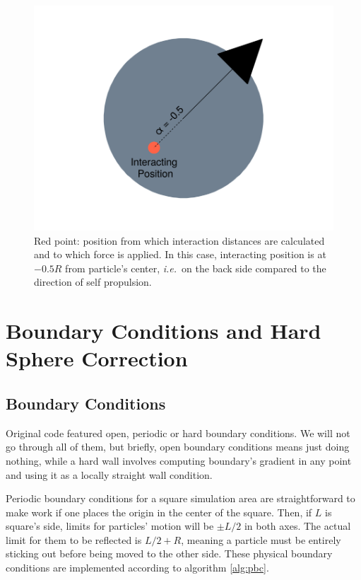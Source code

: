 \documentclass[../../master_thesis_np.tex]{subfiles}
\begin{document}
	\begin{figure}[htp]
		\centering
		\includegraphics[width=\textwidth]{singpart_draw.png}
		\caption{\color{brown}Red point: position from which interaction distances are calculated and to which force is applied. In this case, interacting position is at $-0.5R$ from particle's center, {\it i.e.}\ on the back side compared to  the direction of self propulsion.}
		\label{fig:geom_model}
	\end{figure}
	
	\section{Boundary Conditions and Hard Sphere Correction}
	\subsection{Boundary Conditions}
	Original code featured open, periodic or hard boundary conditions. 
	We will not go through all of them, but briefly, open boundary conditions means just doing nothing, while a hard wall involves computing boundary's gradient in any point and using it as a locally straight wall condition.
	
	Periodic boundary conditions for a square simulation area are straightforward to make work if one places the origin in the center of the square. 
	Then, if $L$ is square's side, limits for particles' motion will be $\pm L/2$ in both axes. 
	The actual limit for them to be reflected is $L/2 + R$, meaning a particle must be entirely sticking out before being moved to the other side. 
	These physical boundary conditions are implemented according to algorithm \ref{alg:pbc}.
	
\end{document}
